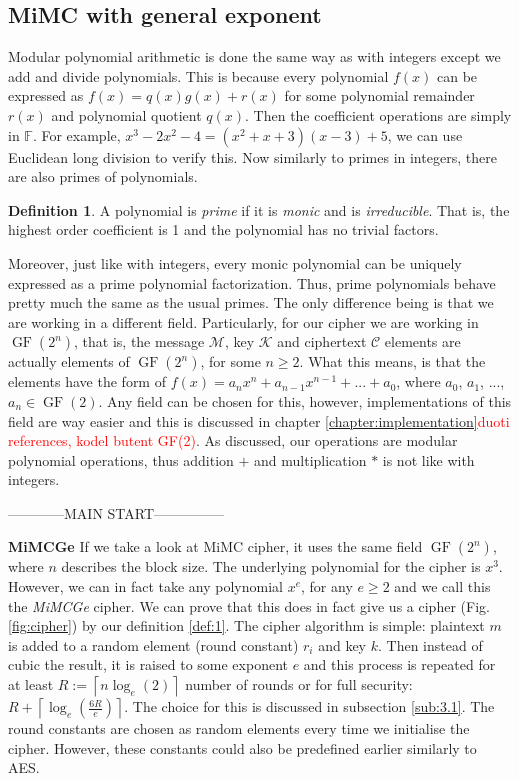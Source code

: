 \documentclass{Resources/UoBLab1}
\theoremstyle{definition}
\newtheorem{definition}[theorem]{Definition}
\begin{document}
\subsection{MiMC with general exponent}
Modular polynomial arithmetic is done the same way as with integers except we add and divide polynomials. This is because every polynomial $f(x)$ can be expressed as $f(x) = q(x)g(x) + r(x)$ for some polynomial remainder $r(x)$ and polynomial quotient $q(x)$. Then the coefficient operations are simply in $\mathbb{F}$. For example, \(x^3-2x^2-4 = (x^2+x+3)(x-3) + 5\), we can use Euclidean long division to verify this. Now similarly to primes in integers, there are also primes of polynomials.
\begin{definition}\label{def:prime-poly}
    A polynomial is \textit{prime} if it is \textit{monic} and is \textit{irreducible}. That is, the highest order coefficient is 1 and the polynomial has no trivial factors.
\end{definition}
Moreover, just like with integers, every monic polynomial can be uniquely expressed as a prime polynomial factorization. Thus, prime polynomials behave pretty much the same as the usual primes. The only difference being is that we are working in a different field. Particularly, for our cipher we are working in $\operatorname{GF}(2^n)$, that is, the message $\mathcal{M}$, key $\mathcal{K}$ and ciphertext $\mathcal{C}$ elements are actually elements of $\operatorname{GF}(2^n)$, for some $n \ge 2$. What this means, is that the elements have the form of $f(x) = a_nx^n + a_{n-1}x^{n-1} + ... + a_0$, where $a_0$, $a_1$, ..., $a_n \in \operatorname{GF}(2)$. Any field can be chosen for this, however, implementations of this field are way easier and this is discussed in chapter \ref{chapter:implementation}\textcolor{red}{duoti references, kodel butent GF(2)}. As discussed, our operations are modular polynomial operations, thus addition $+$ and multiplication $*$ is not like with integers.\medskip

------------MAIN START---------------

\noindent\textbf{MiMCGe} If we take a look at MiMC cipher\cite{MiMC}, it uses the same field $\operatorname{GF}(2^n)$, where $n$ describes the block size. The underlying polynomial for the cipher is $x^3$. However, we can in fact take any polynomial $x^e$, for any $e \ge 2$ and we call this the \textit{MiMCGe} cipher. We can prove that this does in fact give us a cipher (Fig. \ref{fig:cipher}) by our definition \ref{def:1}. The cipher algorithm is simple: plaintext $m$ is added to a random element (round constant) $r_i$ and key $k$. Then instead of cubic the result, it is raised to some exponent $e$ and this process is repeated for at least $R := \left\lceil n\log_e(2) \right\rceil$ number of rounds or for full security: \(R + \left\lceil \log_e(\frac{6R}{e}) \right\rceil\). The choice for this is discussed in subsection \ref{sub:3.1}. The round constants are chosen as random elements every time we initialise the cipher. However, these constants could also be predefined earlier similarly to AES.
\end{document}
